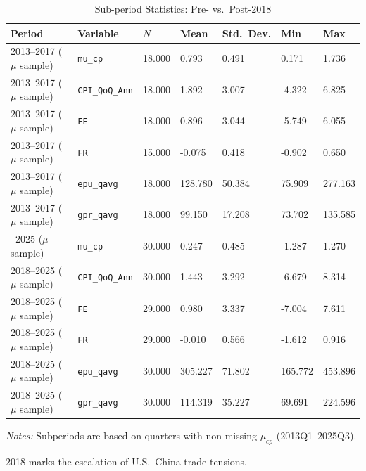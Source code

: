 \begin{table}[!htbp]
\centering
\small
\caption{Sub-period Statistics: Pre- vs.\ Post-2018}
\label{tab:subperiod}
\begin{threeparttable}
    \begin{tabular}{@{}lllllll@{}}
        \toprule
        Period & Variable & $N$ & Mean & Std.\ Dev. & Min & Max \\
        \midrule
        2013--2017 ($\mu$ sample) & \texttt{mu\_cp} & 18.000 & 0.793 & 0.491 & 0.171 & 1.736 \\
        2013--2017 ($\mu$ sample) & \texttt{CPI\_QoQ\_Ann} & 18.000 & 1.892 & 3.007 & -4.322 & 6.825 \\
        2013--2017 ($\mu$ sample) & \texttt{FE} & 18.000 & 0.896 & 3.044 & -5.749 & 6.055 \\
        2013--2017 ($\mu$ sample) & \texttt{FR} & 15.000 & -0.075 & 0.418 & -0.902 & 0.650 \\
        2013--2017 ($\mu$ sample) & \texttt{epu\_qavg} & 18.000 & 128.780 & 50.384 & 75.909 & 277.163 \\
        2013--2017 ($\mu$ sample) & \texttt{gpr\_qavg} & 18.000 & 99.150 & 17.208 & 73.702 & 135.585 \\
        \addlinespace
        2018--2025 ($\mu$ sample) & \texttt{mu\_cp} & 30.000 & 0.247 & 0.485 & -1.287 & 1.270 \\
        2018--2025 ($\mu$ sample) & \texttt{CPI\_QoQ\_Ann} & 30.000 & 1.443 & 3.292 & -6.679 & 8.314 \\
        2018--2025 ($\mu$ sample) & \texttt{FE} & 29.000 & 0.980 & 3.337 & -7.004 & 7.611 \\
        2018--2025 ($\mu$ sample) & \texttt{FR} & 29.000 & -0.010 & 0.566 & -1.612 & 0.916 \\
        2018--2025 ($\mu$ sample) & \texttt{epu\_qavg} & 30.000 & 305.227 & 71.802 & 165.772 & 453.896 \\
        2018--2025 ($\mu$ sample) & \texttt{gpr\_qavg} & 30.000 & 114.319 & 35.227 & 69.691 & 224.596 \\
        \bottomrule
    \end{tabular}
    \begin{tablenotes}[flushleft]
        \footnotesize
        \item \textit{Notes:} Subperiods are based on quarters with non-missing $\mu_{cp}$ (2013Q1--2025Q3).
        \item 2018 marks the escalation of U.S.--China trade tensions.
    \end{tablenotes}
\end{threeparttable}
\end{table}
